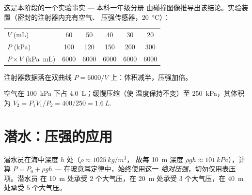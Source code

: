 \begin{remark}
这是本阶段的一个实验事实 --- 本科一年级分册
由碰撞图像推导出该结论。实验装置（密封的注射器内充有空气、
压强传感器，\qty{20}{\degreeCelsius}）：
\begin{center}
\begin{tabular}{lccccc}
$V$ (\unit{mL}) & 60 & 50 & 40 & 30 & 20 \\
$P$ (\unit{kPa}) & 100 & 120 & 150 & 200 & 300 \\
$P \times V$ (\unit{kPa.mL}) & 6000 & 6000 & 6000 & 6000 & 6000
\end{tabular}
\end{center}
\end{remark}

\begin{omfigure}

{\small 注射器数据落在双曲线 $P = 6000/V$ 上：体积减半，压强加倍。}
\end{omfigure}

\begin{example}[压缩的注射器]\label{ex:g10:pressure:boyle}
空气在 \qty{100}{kPa} 下占 \qty{4.0}{L}；缓慢压缩（使
温度保持不变）至 \qty{250}{kPa}，其体积为
$V_2 = P_1 V_1 / P_2 = 400/250 = \qty{1.6}{L}$.
\end{example}

\section{潜水：压强的应用}

\begin{method}[深度处的绝对压强]\label{met:g10:pressure:dive}
潜水员在海中深度 $h$ 处（$\rho \approx \qty{1025}{kg/m^3}$，
故每 \qty{10}{m} 深度 $\rho g h \approx \qty{101}{kPa}$），计算
$P = P_0 + \rho g h$ --- 在玻意耳定律中，始终使用这一
\emph{绝对压强}，切勿仅用表压项。潜水员
在 \qty{10}{m} 处承受 $2$ 个大气压，在 \qty{20}{m} 处承受 $3$ 个大气压，在
\qty{40}{m} 处承受 $5$ 个大气压。
\end{method}

